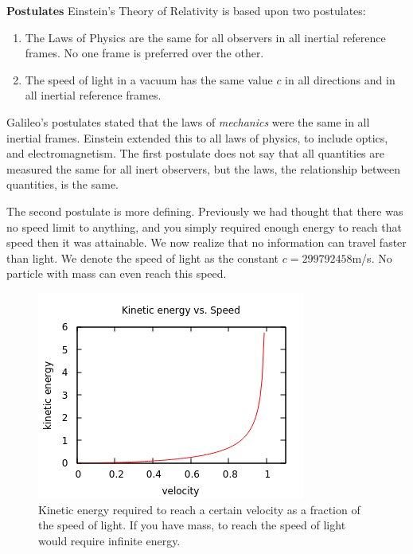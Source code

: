 \documentclass[conference]{IEEEtran}
\begin{document}
\textbf{Postulates} Einstein's Theory of Relativity is based upon two postulates: 
\begin{enumerate}
\item The Laws of Physics are the same for all observers in all inertial reference frames. No one frame is preferred over the other.
\item The speed of light in a vacuum has the same value $c$ in all directions and in all inertial reference frames.
\end{enumerate} 

Galileo's postulates stated that the laws of \textit{mechanics} were the same in all inertial frames. Einstein extended this to all laws of physics, to include optics, and electromagnetism. The first postulate does not say that all quantities are measured the same for all inert observers, but the laws, the relationship between quantities, is the same. 

The second postulate is more defining. Previously we had thought that there was no speed limit to anything, and you simply required enough energy to reach that speed then it was attainable. We now realize that no information can travel faster than light. We denote the speed of light as the constant $c = 299792458$m/s. No particle with mass can even reach this speed. \cite{einstein}
\begin{figure}[ht!]
\includegraphics[scale=1]{./IMG/energyVsSpeed.png} 
\caption{Kinetic energy required to reach a certain velocity as a fraction of the speed of light. If you have mass, to reach the speed of light would require infinite energy.}
\end{figure}
\end{document}
